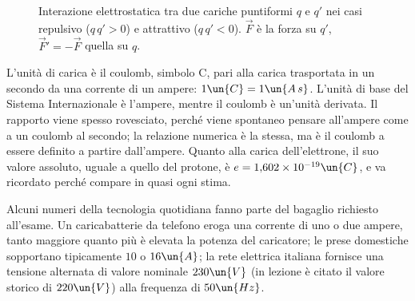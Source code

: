 \documentclass[main.tex]{subfiles}
\begin{document}
\begin{figure}[htbp]
  \caption{Interazione elettrostatica tra due cariche puntiformi $q$ e $q'$ nei casi repulsivo ($q\,q' > 0$) e attrattivo ($q\,q' < 0$). $\vec F$ è la forza su $q'$, $\vec F'=-\vec F$ quella su $q$.}
  \label{fig:campo:legge_coulomb_infografica}
\end{figure}

L'unità di carica è il coulomb, simbolo $\mathrm{C}$, pari alla carica trasportata in un secondo da una corrente di un ampere: $1\un{C}=1\un{A\,s}$. L'unità di base del Sistema Internazionale è l'ampere, mentre il coulomb è un'unità derivata. Il rapporto viene spesso rovesciato, perché viene spontaneo pensare all'ampere come a un coulomb al secondo; la relazione numerica è la stessa, ma è il coulomb a essere definito a partire dall'ampere. Quanto alla carica dell'elettrone, il suo valore assoluto, uguale a quello del protone, è $e=1{,}602\times10^{-19}\un{C}$, e va ricordato perché compare in quasi ogni stima.

Alcuni numeri della tecnologia quotidiana fanno parte del bagaglio richiesto all'esame. Un caricabatterie da telefono eroga una corrente di uno o due ampere, tanto maggiore quanto più è elevata la potenza del caricatore; le prese domestiche sopportano tipicamente $10$ o $16\un{A}$; la rete elettrica italiana fornisce una tensione alternata di valore nominale $230\un{V}$ (in lezione è citato il valore storico di $220\un{V}$) alla frequenza di $50\un{Hz}$.
\end{document}
